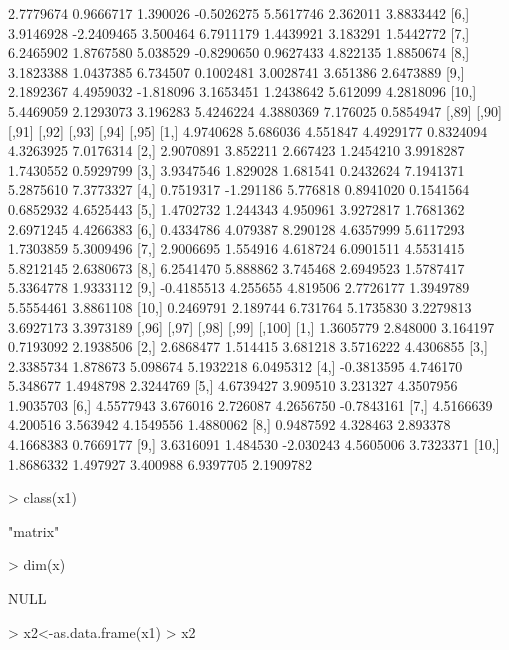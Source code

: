 \documentclass[12pt]{article}
\begin{document}
\begin{Schunk}
\begin{Soutput}
 [5,] 2.7779674  0.9666717  1.390026 -0.5026275 5.5617746 2.362011 3.8833442
 [6,] 3.9146928 -2.2409465  3.500464  6.7911179 1.4439921 3.183291 1.5442772
 [7,] 6.2465902  1.8767580  5.038529 -0.8290650 0.9627433 4.822135 1.8850674
 [8,] 3.1823388  1.0437385  6.734507  0.1002481 3.0028741 3.651386 2.6473889
 [9,] 2.1892367  4.4959032 -1.818096  3.1653451 1.2438642 5.612099 4.2818096
[10,] 5.4469059  2.1293073  3.196283  5.4246224 4.3880369 7.176025 0.5854947
           [,89]     [,90]    [,91]     [,92]     [,93]     [,94]     [,95]
 [1,]  4.9740628  5.686036 4.551847 4.4929177 0.8324094 4.3263925 7.0176314
 [2,]  2.9070891  3.852211 2.667423 1.2454210 3.9918287 1.7430552 0.5929799
 [3,]  3.9347546  1.829028 1.681541 0.2432624 7.1941371 5.2875610 7.3773327
 [4,]  0.7519317 -1.291186 5.776818 0.8941020 0.1541564 0.6852932 4.6525443
 [5,]  1.4702732  1.244343 4.950961 3.9272817 1.7681362 2.6971245 4.4266383
 [6,]  0.4334786  4.079387 8.290128 4.6357999 5.6117293 1.7303859 5.3009496
 [7,]  2.9006695  1.554916 4.618724 6.0901511 4.5531415 5.8212145 2.6380673
 [8,]  6.2541470  5.888862 3.745468 2.6949523 1.5787417 5.3364778 1.9333112
 [9,] -0.4185513  4.255655 4.819506 2.7726177 1.3949789 5.5554461 3.8861108
[10,]  0.2469791  2.189744 6.731764 5.1735830 3.2279813 3.6927173 3.3973189
           [,96]    [,97]     [,98]     [,99]     [,100]
 [1,]  1.3605779 2.848000  3.164197 0.7193092  2.1938506
 [2,]  2.6868477 1.514415  3.681218 3.5716222  4.4306855
 [3,]  2.3385734 1.878673  5.098674 5.1932218  6.0495312
 [4,] -0.3813595 4.746170  5.348677 1.4948798  2.3244769
 [5,]  4.6739427 3.909510  3.231327 4.3507956  1.9035703
 [6,]  4.5577943 3.676016  2.726087 4.2656750 -0.7843161
 [7,]  4.5166639 4.200516  3.563942 4.1549556  1.4880062
 [8,]  0.9487592 4.328463  2.893378 4.1668383  0.7669177
 [9,]  3.6316091 1.484530 -2.030243 4.5605006  3.7323371
[10,]  1.8686332 1.497927  3.400988 6.9397705  2.1909782
\end{Soutput}
\begin{Sinput}
> class(x1)
\end{Sinput}
\begin{Soutput}
[1] "matrix"
\end{Soutput}
\begin{Sinput}
> dim(x)
\end{Sinput}
\begin{Soutput}
NULL
\end{Soutput}
\begin{Sinput}
> x2<-as.data.frame(x1)
> x2
\end{Sinput}
\begin{Soutput}

\end{Soutput}
\end{Schunk}
\end{document}
